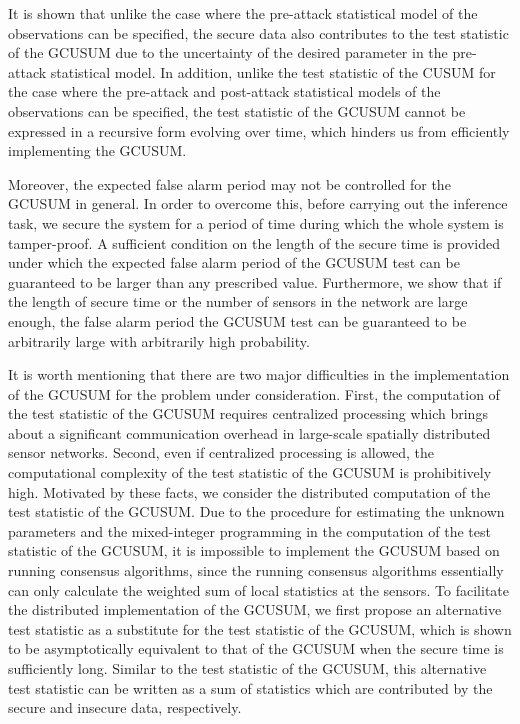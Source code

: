 \documentclass[11pt, draftclsnofoot, onecolumn]{IEEEtran}
\begin{document}
It is shown that unlike the case where the pre-attack statistical model of the observations can be specified, the secure data also contributes to the test statistic of the GCUSUM due to the uncertainty of the desired parameter in the pre-attack statistical model. In addition, unlike the test statistic of the CUSUM for the case where the pre-attack and post-attack statistical models of the observations can be specified, the test statistic of the GCUSUM cannot be expressed in a recursive form evolving over time, which hinders us from efficiently implementing the GCUSUM. 

  Moreover,   the expected false alarm period may not be controlled for the GCUSUM in general. In order to overcome this, before carrying out the inference task, we secure the system for a period of time during which the whole system is tamper-proof. A sufficient condition on the length of the secure time is provided under which the expected false alarm period   of the GCUSUM test   can be guaranteed to be larger than any prescribed value. Furthermore, we show that if the length of secure time or the number of sensors in the network are large enough, the false alarm period   the GCUSUM test   can be guaranteed to be arbitrarily large with   arbitrarily   high probability. 



  It is worth mentioning that there are two major difficulties in the implementation of the GCUSUM for the problem under consideration.  First, the computation of the test statistic of the GCUSUM requires centralized processing which brings about a significant communication overhead in large-scale spatially distributed sensor networks.  Second, even if centralized processing is allowed, the computational complexity of the test statistic of the GCUSUM is prohibitively high.
Motivated by these facts,   we consider the distributed computation of the test statistic of the GCUSUM. 
Due to the procedure for estimating the unknown parameters and the mixed-integer programming in the computation of the test statistic of the GCUSUM, it is impossible to implement the GCUSUM based on running consensus algorithms, since the running consensus algorithms essentially can only calculate the weighted sum of local statistics at the sensors. To facilitate the distributed implementation of the GCUSUM, we first propose an alternative test statistic as a substitute for the test statistic of the GCUSUM, which is shown to be asymptotically equivalent to that of the GCUSUM when the secure time is sufficiently long. Similar to the test statistic of the GCUSUM, this alternative test statistic can be written as a sum of  statistics which are contributed by the secure and insecure data, respectively. 
\end{document}
